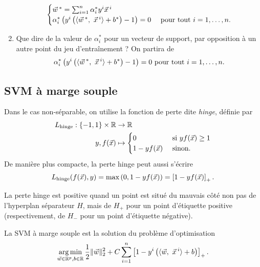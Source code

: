 \documentclass[french,11pt]{article}
\begin{document}
\begin{enumerate}[resume]
  \begin{equation*}
    \begin{cases}
  \ww^* = \sum_{i=1}^n \alpha_i^* y^i \xx^i & \\
  \alpha_i^* \left(y^i \left(\innerproduct{\ww^*,~\xx^i} + b^*\right) - 1 \right) = 0 & \text{ pour tout } i=1, \dots, n.\\
\end{cases}
\end{equation*}
\item Que dire de la valeur de $\alpha_i^*$ pour un vecteur de support, par opposition à un autre point du jeu d'entraînement ? On partira de
  \begin{equation*}
    \alpha_i^* \left(y^i \left(\innerproduct{\ww^*,~\xx^i} + b^*\right) - 1 \right) = 0  \text{ pour tout } i=1, \dots, n.
  \end{equation*}
  \end{enumerate}



\subsection{SVM à marge souple}
Dans le cas non-séparable, on utilise la fonction de perte dite \textit{hinge},
définie par
\begin{align*}
  L_{\text{hinge}} : \{-1, 1\} \times \RR & \rightarrow \RR \\
  y, f(\xx) & \mapsto
              \begin{cases}
                0 & \mbox{ si } y f(\xx) \geq 1 \\
                1 - y f(\xx) & \mbox{ sinon.}
              \end{cases}
\end{align*}
De manière plus compacte, la perte hinge peut aussi s'écrire 
\begin{equation*}
  \label{eq:hinge-loss}
  L_{\text{hinge}}(f(\xx), y) = \max\left(0, 1 - y f(\xx) \right) = \left[ 1 - y f(\xx)\right]_+. 
\end{equation*}

La perte hinge est positive quand un point est situé du mauvais côté non pas de
l'hyperplan séparateur $H$, mais de $H_+$ pour un point d'étiquette positive
(respectivement, de $H_-$ pour un point d'étiquette négative).

La SVM à marge souple est la solution du problème d'optimisation
\begin{equation}
  \argmin_{\ww \in \RR^p, b \in \RR} \frac{1}{2} \ltwonorm{\ww}^2 + 
  C \sum_{i=1}^n \left[ 1 - y^i  \left(\innerproduct{\ww,~\xx^i} + b\right) \right]_+.
  \label{eq:soft-margin-svm}
\end{equation}
\end{document}
